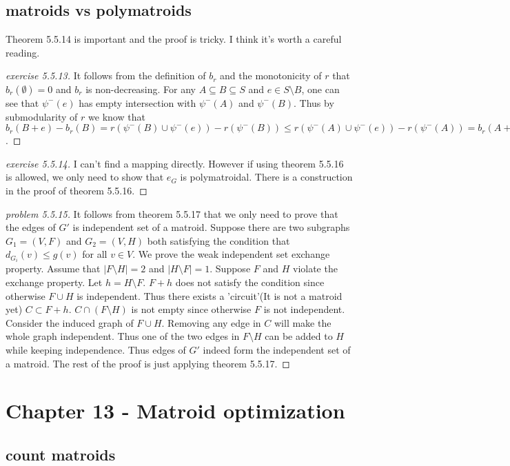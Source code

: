 \documentclass[12pt]{article}
\begin{document}
\subsection{matroids vs polymatroids}
Theorem 5.5.14 is important and the proof is tricky. I think it's worth a careful reading.
\begin{proof}[exercise 5.5.13]
    It follows from the definition of $b_r$ and the monotonicity of $r$ that $b_r(\emptyset)=0$ and $b_r$ is non-decreasing. For any $A\subseteq B\subseteq S$ and $e\in S\setminus B$, one can see that $\psi^-(e)$ has empty intersection with $\psi^-(A)$ and $\psi^-(B)$. Thus by submodularity of $r$ we know that $b_r(B+e)-b_r(B)=r(\psi^-(B)\cup \psi^-(e))-r(\psi^-(B))\leq r(\psi^-(A)\cup \psi^-(e))-r(\psi^-(A))=b_r(A+e)-b_r(A)$.
\end{proof}

\begin{proof}[exercise 5.5.14]
    I can't find a mapping directly. However if using theorem 5.5.16 is allowed, we only need to show that $e_G$ is polymatroidal. There is a construction in the proof of theorem 5.5.16.
\end{proof}

\begin{proof}[problem 5.5.15]
    It follows from theorem 5.5.17 that we only need to prove that the edges of $G'$ is independent set of a matroid. Suppose there are two subgraphs $G_1=(V,F)$ and $G_2=(V,H)$ both satisfying the condition that $d_{G_i}(v)\leq g(v)$ for all $v\in V$. We prove the weak independent set exchange property. Assume that $|F\setminus H|=2$ and $|H\setminus F|=1$. Suppose $F$ and $H$ violate the exchange property. Let $h=H\setminus F$. $F+h$ does not satisfy the condition since otherwise $F\cup H$ is independent. Thus there exists a 'circuit'(It is not a matroid yet) $C\subset F+h$. $C\cap (F\setminus H)$ is not empty since otherwise $F$ is not independent. Consider the induced graph of $F\cup H$. Removing any edge in $C$ will make the whole graph independent. Thus one of the two edges in $F\setminus H$ can be added to $H$ while keeping independence. Thus edges of $G'$ indeed form the independent set of a matroid. The rest of the proof is just applying theorem 5.5.17.
\end{proof}
\section{Chapter 13 - Matroid optimization}
\subsection{count matroids}



\newpage


\end{document}
